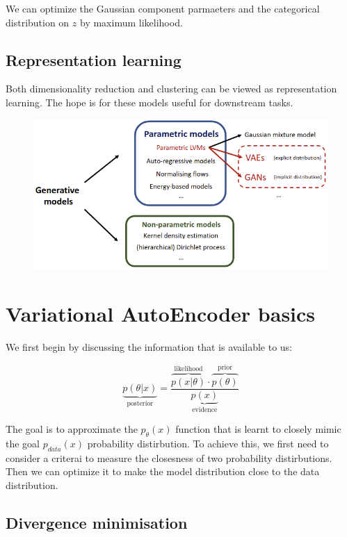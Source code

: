 \documentclass[11pt]{article}
\begin{document}
We can optimize the Gaussian component parmaeters and the categorical distribution on $z$ by maximum likelihood.

\subsection{Representation learning}\label{sect:Representation learning}

Both dimensionality reduction and clustering can be viewed as representation learning. The hope is for these models useful for downstream tasks.

\begin{figure}[H]
    \centering
    \includegraphics[width=.7\linewidth]{figures/taxonomy.png}
    \caption{}\label{fig:taxonomy}
\end{figure}

\section{Variational AutoEncoder basics}\label{sect:Variational AutoEncoder basics}

We first begin by discussing the information that is available to us:

\begin{equation}
    \underbrace{p(\theta|x)}_\text{posterior} = \frac{\overbrace{p(x|\theta)}^\text{likelihood} \cdot \overbrace{p(\theta)}^\text{prior}}{\underbrace{p(x)}_\text{evidence}}
\end{equation}

The goal is to approximate the $p_\theta(x)$ function that is learnt to closely mimic the goal $p_{data}(x)$ probability distirbution. To achieve this, we first need to consider a criterai to measure the closesness of two probability distirbutions. Then we can optimize it to make the model distribution close to the data distribution.

\subsection{Divergence minimisation}\label{sect:Divergence minimisation}
\end{document}
